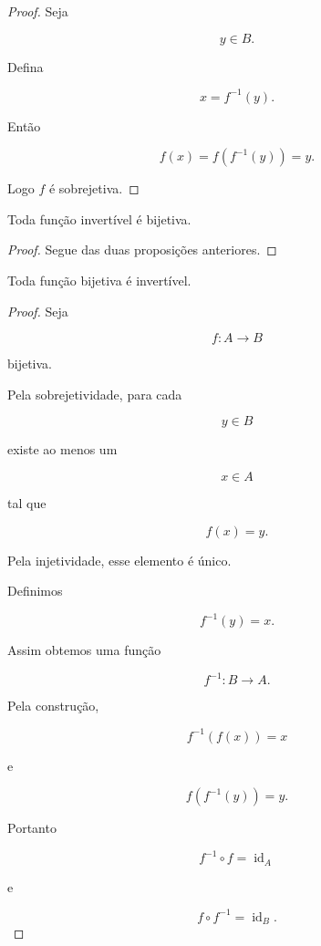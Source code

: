 \documentclass[../../main]{subfiles}
\begin{document}
\begin{proof}

	Seja

	\[
		y\in B.
	\]

	Defina

	\[
		x=f^{-1}(y).
	\]

	Então

	\[
		f(x)
		=
		f(f^{-1}(y))
		=
		y.
	\]

	Logo \(f\) é sobrejetiva.

\end{proof}

\begin{prop}
	\label{prop:matematica:funcoes:funcoes-inversas:invertivel-implica-bijetiva}

	Toda função invertível é bijetiva.

\end{prop}

\begin{proof}

	Segue das duas proposições anteriores.

\end{proof}

\begin{prop}
	\label{prop:matematica:funcoes:funcoes-inversas:bijetiva-implica-invertivel}

	Toda função bijetiva é invertível.

\end{prop}

\begin{proof}

	Seja

	\[
		f:A\to B
	\]

	bijetiva.

	Pela sobrejetividade, para cada

	\[
		y\in B
	\]

	existe ao menos um

	\[
		x\in A
	\]

	tal que

	\[
		f(x)=y.
	\]

	Pela injetividade, esse elemento é único.

	Definimos

	\[
		f^{-1}(y)=x.
	\]

	Assim obtemos uma função

	\[
		f^{-1}:B\to A.
	\]

	Pela construção,

	\[
		f^{-1}(f(x))
		=
		x
	\]

	e

	\[
		f(f^{-1}(y))
		=
		y.
	\]

	Portanto

	\[
		f^{-1}\circ f
		=
		\operatorname{id}_A
	\]

	e

	\[
		f\circ f^{-1}
		=
		\operatorname{id}_B.
	\]

\end{proof}
\end{document}
